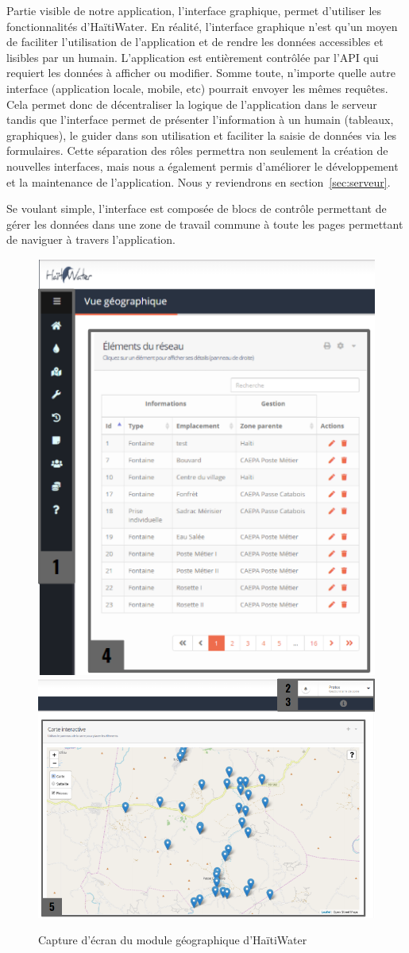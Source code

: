 \documentclass{EPL-master-thesis-covers-FR}
\begin{document}
			Partie visible de notre application, l'interface graphique, permet d'utiliser les fonctionnalités d'HaïtiWater. En réalité, l'interface graphique n'est qu'un moyen de faciliter l'utilisation de l'application et de rendre les données accessibles et lisibles par un humain. L'application est entièrement contrôlée par l'API qui requiert les données à afficher ou modifier. Somme toute, n'importe quelle autre interface (application locale, mobile, etc) pourrait envoyer les mêmes requêtes. Cela permet donc de décentraliser la logique de l'application dans le serveur tandis que l'interface permet de présenter l'information à un humain (tableaux, graphiques), le guider dans son utilisation et faciliter la saisie de données via les formulaires. Cette séparation des rôles permettra non seulement la création de nouvelles interfaces, mais nous a également permis d'améliorer le développement et la maintenance de l'application. Nous y reviendrons en section~\ref{sec:serveur}.

			Se voulant simple, l'interface est composée de blocs de contrôle permettant de gérer les données dans une zone de travail commune à toute les pages permettant de naviguer à travers l'application.

			\begin{figure}[H]
				\centering
				\includegraphics[width=.5\textwidth]{images/screen_gis_numbered_1.png}
				\includegraphics[width=.9\textwidth]{images/screen_gis_numbered_2.png}
				\caption{Capture d'écran du module géographique d'HaïtiWater}
				\label{fig:capture_gis}
			\end{figure}
\end{document}
